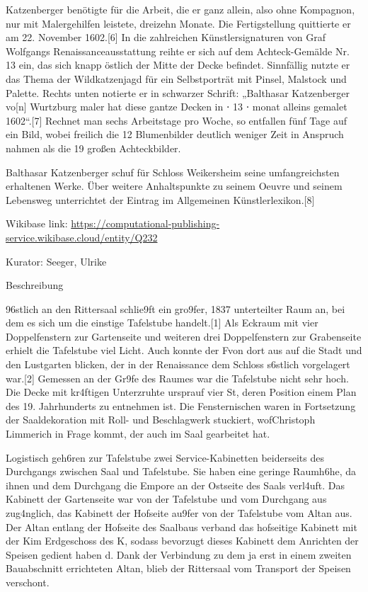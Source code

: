 \documentclass[
  letterpaper,
]{book}
\begin{document}
Katzenberger benötigte für die Arbeit, die er ganz allein, also ohne
Kompagnon, nur mit Malergehilfen leistete, dreizehn Monate. Die
Fertigstellung quittierte er am 22. November 1602.{[}6{]} In die
zahlreichen Künstlersignaturen von Graf Wolfgangs Renaissanceausstattung
reihte er sich auf dem Achteck-Gemälde Nr. 13 ein, das sich knapp
östlich der Mitte der Decke befindet. Sinnfällig nutzte er das Thema der
Wildkatzenjagd für ein Selbstporträt mit Pinsel, Malstock und Palette.
Rechts unten notierte er in schwarzer Schrift: „Balthasar Katzenberger
vo{[}n{]} Wurtzburg maler hat diese gantze Decken in ⋅ 13 ⋅ monat
alleins gemalet 1602``.{[}7{]} Rechnet man sechs Arbeitstage pro Woche,
so entfallen fünf Tage auf ein Bild, wobei freilich die 12 Blumenbilder
deutlich weniger Zeit in Anspruch nahmen als die 19 großen
Achteckbilder.

Balthasar Katzenberger schuf für Schloss Weikersheim seine
umfangreichsten erhaltenen Werke. Über weitere Anhaltspunkte zu seinem
Oeuvre und seinem Lebensweg unterrichtet der Eintrag im Allgemeinen
Künstlerlexikon.{[}8{]}

Wikibase link:
\url{https://computational-publishing-service.wikibase.cloud/entity/Q232}

Kurator: Seeger, Ulrike

Beschreibung

\x96stlich an den Rittersaal schlie\x9ft ein gro\x9fer, 1837
unterteilter Raum an, bei dem es sich um die einstige Tafelstube
handelt.{[}1{]} Als Eckraum mit vier Doppelfenstern zur Gartenseite und
weiteren drei Doppelfenstern zur Grabenseite erhielt die Tafelstube viel
Licht. Auch konnte der F\xbcrst von dort aus auf die Stadt und den
Lustgarten blicken, der in der Renaissance dem Schloss
s\xbcd{}\xb6stlich vorgelagert war.{[}2{]} Gemessen an der
Gr\x9fe des Raumes war die Tafelstube nicht sehr hoch. Die
Decke mit kr\xa4ftigen Unterz\xbcgen ruhte
urspr\xbcnglich auf vier St\xbctzen, deren Position einem Plan
des 19. Jahrhunderts zu entnehmen ist. Die Fensternischen waren in
Fortsetzung der Saaldekoration mit Roll- und Beschlagwerk stuckiert,
wof\xbcr Christoph Limmerich in Frage kommt, der auch im Saal
gearbeitet hat.

Logistisch geh\xb6ren zur Tafelstube zwei Service-Kabinetten
beiderseits des Durchgangs zwischen Saal und Tafelstube. Sie haben eine
geringe Raumh\xb6he, da \xbcber ihnen und dem Durchgang die
Empore an der Ostseite des Saals verl\xa4uft. Das Kabinett der
Gartenseite war von der Tafelstube und vom Durchgang aus
zug\xa4nglich, das Kabinett der Hofseite au\x9fer von der
Tafelstube vom Altan aus. Der Altan entlang der Hofseite des Saalbaus
verband das hofseitige Kabinett mit der K\xbcche im Erdgeschoss des
K\xbcchenbaus, sodass bevorzugt dieses Kabinett dem Anrichten der
Speisen gedient haben d\xbcrfte. Dank der Verbindung zu dem ja erst
in einem zweiten Bauabschnitt errichteten Altan, blieb der Rittersaal
vom Transport der Speisen verschont.
\end{document}
